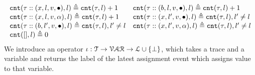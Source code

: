 \[
\begin{array}{ll}
\mathtt{cnt}(\mathtt{\tau} :: (x, l, v, \bullet), l ) \triangleq \mathtt{cnt}(\mathtt{\tau}, l) + 1
&
\mathtt{cnt}(\mathtt{\tau}  ::(b, l, v, \bullet), l) \triangleq \mathtt{cnt}(\mathtt{\tau}, l) + 1
\\
\mathtt{cnt}(\mathtt{\tau}  :: (x, l, v, \alpha), l) \triangleq \mathtt{cnt}(\mathtt{\tau}, l) + 1
&
\mathtt{cnt}(\mathtt{\tau}  :: (x, l', v, \bullet), l) \triangleq \mathtt{cnt}(\mathtt{\tau}, l), l' \neq l
\\
\mathtt{cnt}(\mathtt{\tau}  :: (b, l', v, \bullet), l) \triangleq \mathtt{cnt}(\mathtt{\tau}, l), l' \neq l
&
\mathtt{cnt}(\mathtt{\tau}  :: (x, l', v, \alpha), l) \triangleq \mathtt{cnt}(\mathtt{\tau}, l), l' \neq l
\\
\mathtt{cnt}({[]}, l) \triangleq 0
&
\end{array}
\]
%
%
We introduce an operator $\iota : \mathcal{T} \to \mathcal{VAR} \to \mathcal{L} \cup \{\bot\}$, which 
takes a trace and a variable and returns the label of the latest assignment event which assigns value to that variable.

